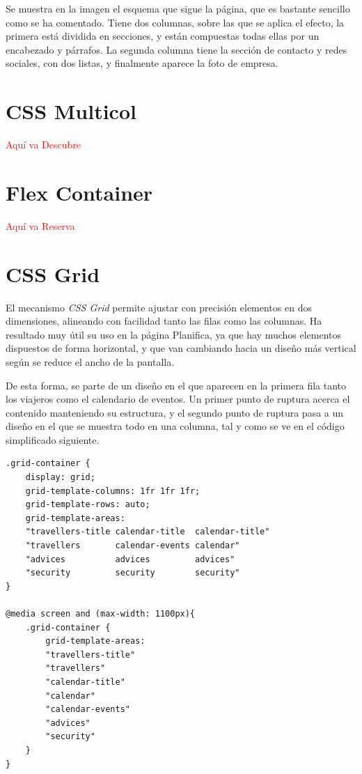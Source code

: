 \documentclass[11pt, a4paper]{book}
\begin{document}
	Se muestra en la imagen el esquema que sigue la página, que es bastante sencillo como se ha comentado. Tiene dos columnas, sobre las que se aplica el efecto, la primera está dividida en secciones, y están compuestas todas ellas por un encabezado y párrafos. La segunda columna tiene la sección de contacto y redes sociales, con dos listas, y finalmente aparece la foto de empresa.

	
	\section{CSS Multicol}
	
	\begin{Huge}
		\textcolor{red}{Aquí va Descubre}
	\end{Huge}
	
	\section{Flex Container}
	
	\begin{Huge}
		\textcolor{red}{Aquí va Reserva}
	\end{Huge}

	\section{CSS Grid}
	El mecanismo \textit{CSS Grid} permite ajustar con precisión elementos en dos dimensiones, alineando con facilidad tanto las filas como las columnas. Ha resultado muy útil su uso en la página Planifica, ya que hay muchos elementos dispuestos de forma horizontal, y que van cambiando hacia un diseño más vertical según se reduce el ancho de la pantalla.
	
	De esta forma, se parte de un diseño en el que aparecen en la primera fila tanto los viajeros como el calendario de eventos. Un primer punto de ruptura acerca el contenido manteniendo su estructura, y el segundo punto de ruptura pasa a un diseño en el que se muestra todo en una columna, tal y como se ve en el código simplificado siguiente. 
	
	\begin{lstlisting}[]
.grid-container {
	display: grid;
	grid-template-columns: 1fr 1fr 1fr;
	grid-template-rows: auto;
	grid-template-areas:
	"travellers-title calendar-title  calendar-title"
	"travellers       calendar-events calendar"
	"advices          advices         advices"
	"security         security        security"
}

@media screen and (max-width: 1100px){
	.grid-container {
		grid-template-areas:
		"travellers-title"
		"travellers"
		"calendar-title"
		"calendar"
		"calendar-events"
		"advices"
		"security"
	}
}
	\end{lstlisting}
\end{document}
